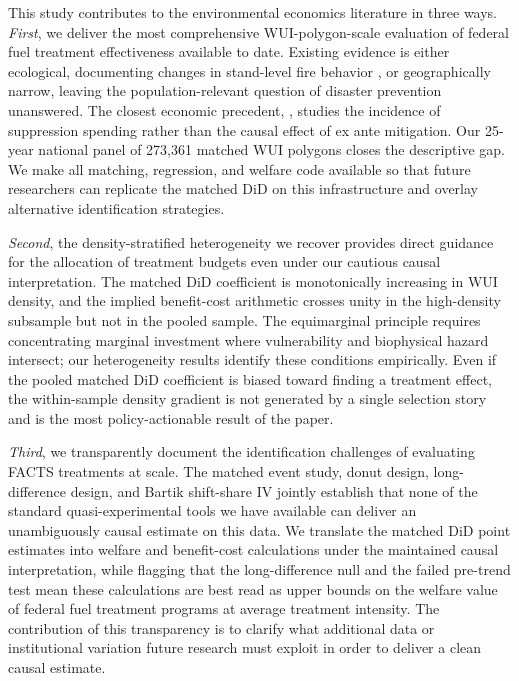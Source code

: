 \documentclass[12pt, letterpaper]{article}
\begin{document}
This study contributes to the environmental economics literature in three ways. \textit{First}, we deliver the most comprehensive WUI-polygon-scale evaluation of federal fuel treatment effectiveness available to date. Existing evidence is either ecological, documenting changes in stand-level fire behavior \citep{agee2005, finney2001, stephens2012}, or geographically narrow, leaving the population-relevant question of disaster prevention unanswered. The closest economic precedent, \citet{baylis2023}, studies the incidence of suppression spending rather than the causal effect of ex ante mitigation. Our 25-year national panel of 273,361 matched WUI polygons closes the descriptive gap. We make all matching, regression, and welfare code available so that future researchers can replicate the matched DiD on this infrastructure and overlay alternative identification strategies.

\textit{Second}, the density-stratified heterogeneity we recover provides direct guidance for the allocation of treatment budgets even under our cautious causal interpretation. The matched DiD coefficient is monotonically increasing in WUI density, and the implied benefit-cost arithmetic crosses unity in the high-density subsample but not in the pooled sample. The equimarginal principle requires concentrating marginal investment where vulnerability and biophysical hazard intersect; our heterogeneity results identify these conditions empirically. Even if the pooled matched DiD coefficient is biased toward finding a treatment effect, the within-sample density gradient is not generated by a single selection story and is the most policy-actionable result of the paper.

\textit{Third}, we transparently document the identification challenges of evaluating FACTS treatments at scale. The matched event study, donut design, long-difference design, and Bartik shift-share IV jointly establish that none of the standard quasi-experimental tools we have available can deliver an unambiguously causal estimate on this data. We translate the matched DiD point estimates into welfare and benefit-cost calculations under the maintained causal interpretation, while flagging that the long-difference null and the failed pre-trend test mean these calculations are best read as upper bounds on the welfare value of federal fuel treatment programs at average treatment intensity. The contribution of this transparency is to clarify what additional data or institutional variation future research must exploit in order to deliver a clean causal estimate.
\end{document}
